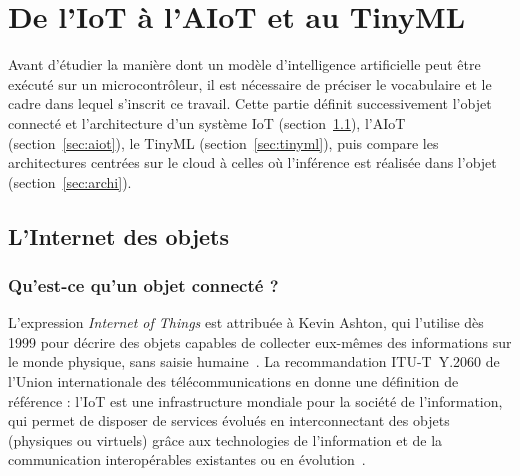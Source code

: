 \chapter{De l'IoT à l'AIoT et au TinyML}
\label{ch:fondements}

Avant d'étudier la manière dont un modèle d'intelligence artificielle peut être
exécuté sur un microcontrôleur, il est nécessaire de préciser le vocabulaire et
le cadre dans lequel s'inscrit ce travail. Cette partie définit successivement
l'objet connecté et l'architecture d'un système IoT
(section~\ref{sec:iot}), l'AIoT (section~\ref{sec:aiot}), le TinyML
(section~\ref{sec:tinyml}), puis compare les architectures centrées sur le cloud
à celles où l'inférence est réalisée dans l'objet
(section~\ref{sec:archi}).

\section{L'Internet des objets}
\label{sec:iot}

\subsection{Qu'est-ce qu'un objet connecté ?}

L'expression \emph{Internet of Things} est attribuée à Kevin Ashton, qui
l'utilise dès 1999 pour décrire des objets capables de collecter eux-mêmes des
informations sur le monde physique, sans saisie humaine~\cite{ashton2009}. La
recommandation ITU-T~Y.2060 de l'Union internationale des télécommunications en
donne une définition de référence : l'IoT est \og une infrastructure mondiale
pour la société de l'information, qui permet de disposer de services évolués en
interconnectant des objets (physiques ou virtuels) grâce aux technologies de
l'information et de la communication interopérables existantes ou en
évolution\fg{}~\cite{itu2012y2060}.

